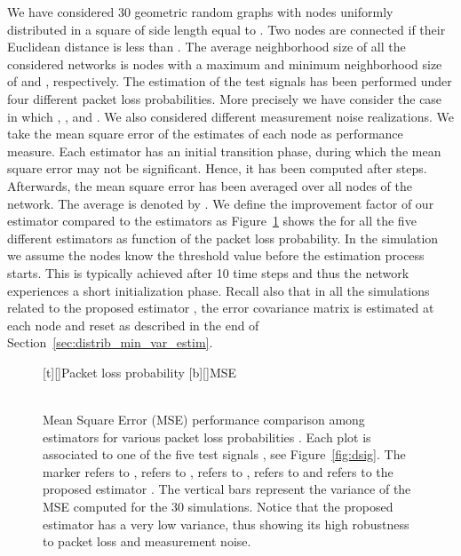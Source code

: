 \documentclass[a4paper,notitlepage,onecolumn]{article}
\def\MSE{\text{MSE}}
\numberwithin{equation}{section}
\begin{document}
We have considered 30 geometric random graphs with  nodes
uniformly distributed in a square of side length equal to .
Two nodes are connected if their Euclidean distance is less than
. The average neighborhood size of all the considered
networks is  nodes with a maximum and minimum neighborhood
size of  and , respectively. The estimation of the test
signals  has been performed under four
different packet loss probabilities. More precisely we have
consider the case in which , ,
 and . We also considered
different measurement noise realizations.
\def\MSE{\text{MSE}}
We take the mean square error of the estimates of each node  as
performance measure. Each estimator has an initial transition
phase, during which the mean square error may not be significant.
Hence, it has been computed after  steps. Afterwards, the mean
square error has been averaged over all nodes of the network. The
average is denoted by . We define the improvement factor of
our estimator compared to the estimators  as 
Figure~\ref{fig:MSE_comparison} shows the  for all
the five different estimators as function of the packet loss
probability. In the simulation we assume the nodes know the
threshold value before the estimation process starts. This is
typically achieved after 10 time steps and thus the network experiences a short
initialization phase. Recall also that in all the simulations
related to the proposed estimator , the error covariance
matrix is estimated at each node and reset as described in the end
of Section~\ref{sec:distrib_min_var_estim}.
\begin{figure}
  \centering
  [t][]{Packet loss probability }
  [b][]{MSE}
  \\
  \\
  \caption{Mean Square Error (MSE) performance comparison among estimators for various packet loss probabilities . Each plot is associated to one of the five test signals , see Figure~\ref{fig:dsig}. The marker  refers to ,  refers to ,  refers to ,  refers to  and  refers to the proposed estimator . The vertical bars represent the variance of the MSE computed for the 30 simulations. Notice that the proposed estimator  has a very low variance, thus showing its high robustness to packet loss and measurement noise.}
  \label{fig:MSE_comparison}
\end{figure}
\end{document}
